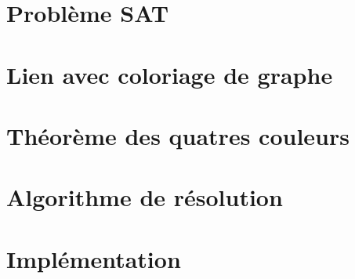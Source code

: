 \documentclass{tipe}
\begin{document}

\clearpage

\part{Problème SAT}


\part{Lien avec coloriage de graphe}


\part{Théorème des quatres couleurs}


\part{Algorithme de résolution}


\part{Implémentation}




\end{document}
